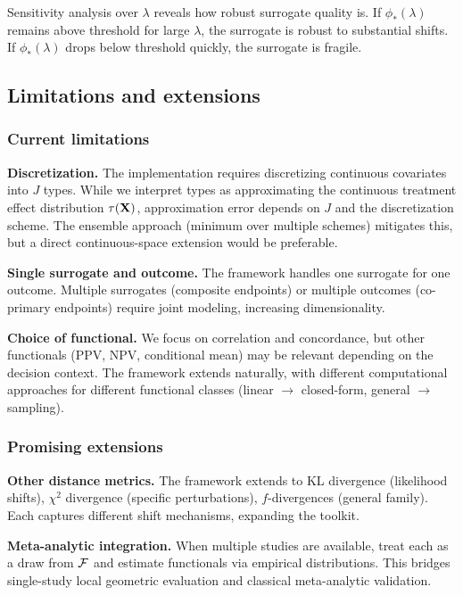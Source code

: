 \documentclass{article}
\begin{document}
Sensitivity analysis over $\lambda$ reveals how robust surrogate quality is. If $\phi_*(\lambda)$ remains above threshold for large $\lambda$, the surrogate is robust to substantial shifts. If $\phi_*(\lambda)$ drops below threshold quickly, the surrogate is fragile.

\subsection{Limitations and extensions}

\subsubsection{Current limitations}

\textbf{Discretization.} The implementation requires discretizing continuous covariates into $J$ types. While we interpret types as approximating the continuous treatment effect distribution $\tau(\mathbf{X})$, approximation error depends on $J$ and the discretization scheme. The ensemble approach (minimum over multiple schemes) mitigates this, but a direct continuous-space extension would be preferable.

\textbf{Single surrogate and outcome.} The framework handles one surrogate for one outcome. Multiple surrogates (composite endpoints) or multiple outcomes (co-primary endpoints) require joint modeling, increasing dimensionality.

\textbf{Choice of functional.} We focus on correlation and concordance, but other functionals (PPV, NPV, conditional mean) may be relevant depending on the decision context. The framework extends naturally, with different computational approaches for different functional classes (linear $\rightarrow$ closed-form, general $\rightarrow$ sampling).

\subsubsection{Promising extensions}

\textbf{Other distance metrics.} The framework extends to KL divergence (likelihood shifts), $\chi^2$ divergence (specific perturbations), $f$-divergences (general family). Each captures different shift mechanisms, expanding the toolkit.

\textbf{Meta-analytic integration.} When multiple studies are available, treat each as a draw from $\mathcal{F}$ and estimate functionals via empirical distributions. This bridges single-study local geometric evaluation and classical meta-analytic validation.
\end{document}
